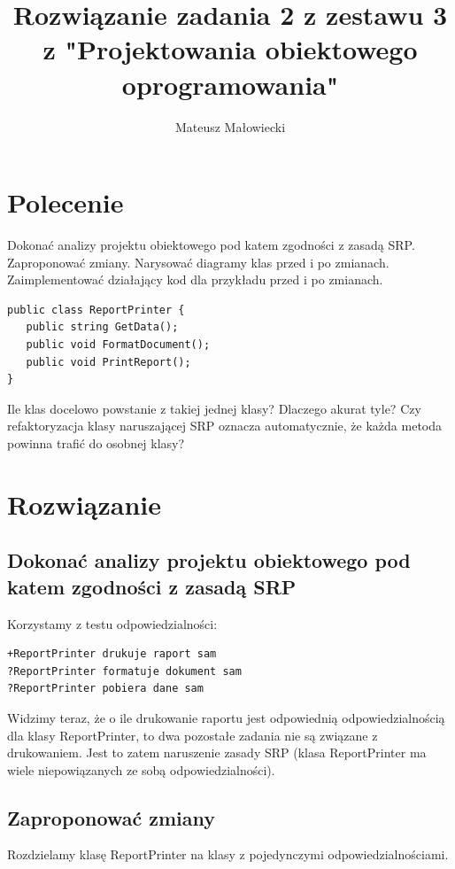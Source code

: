 \documentclass[10pt, a4paper]{article}
\title{Rozwiązanie zadania 2 z zestawu 3 z "Projektowania obiektowego oprogramowania"}
\author{Mateusz Małowiecki}
\begin{document}
\maketitle
\section*{Polecenie}
Dokonać analizy projektu obiektowego pod
katem zgodności z zasadą SRP. Zaproponować zmiany. Narysować diagramy klas przed i
po zmianach. Zaimplementować działający kod dla przykładu przed i po zmianach.
\begin{verbatim}
public class ReportPrinter {
   public string GetData();
   public void FormatDocument();
   public void PrintReport();
}

\end{verbatim}
Ile klas docelowo powstanie z takiej jednej klasy? Dlaczego akurat tyle? Czy refaktoryzacja klasy naruszającej SRP oznacza automatycznie, że każda metoda powinna trafić do
osobnej klasy?

\section*{Rozwiązanie}
\subsection*{Dokonać analizy projektu obiektowego pod
katem zgodności z zasadą SRP}
Korzystamy z testu odpowiedzialności:
\begin{verbatim}
+ReportPrinter drukuje raport sam
?ReportPrinter formatuje dokument sam
?ReportPrinter pobiera dane sam
\end{verbatim}
Widzimy teraz, że o ile drukowanie raportu jest odpowiednią odpowiedzialnością dla klasy ReportPrinter, to dwa pozostałe zadania nie są związane z drukowaniem. Jest to zatem naruszenie zasady SRP (klasa ReportPrinter ma wiele niepowiązanych ze sobą odpowiedzialności).
\subsection*{Zaproponować zmiany}
Rozdzielamy klasę ReportPrinter na klasy z pojedynczymi odpowiedzialnościami.
\end{document}
